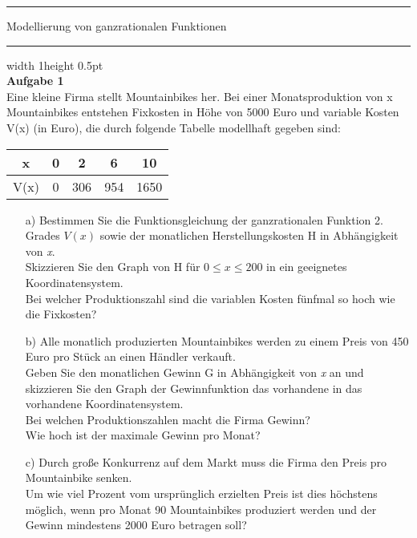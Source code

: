 \hrule \vspace{1ex}
Modellierung von ganzrationalen Funktionen %
\vspace{0,2ex}\hrule width 1\textwidth height 0.5pt
\ \\[0,5cm]
	\textbf{Aufgabe 1}\\[0,2cm]
		Eine kleine Firma stellt Mountainbikes her. Bei einer Monatsproduktion von x Mountainbikes entstehen Fixkosten in 	Höhe von 5000 Euro und variable Kosten V(x) (in Euro), die durch folgende Tabelle modellhaft gegeben sind:\\
	\begin{center}
		\begin{tabular}{|c|c|c|c|c|}\hline
			x	&	0	&	2	&	6	&	10\\	\hline		%
			V(x)&	0	&	306	&	954	&	1650\\	\hline		%
		\end{tabular}
	\end{center}
	\begin{itemize}
		\item[a)]Bestimmen Sie die Funktionsgleichung der ganzrationalen Funktion 2. Grades \(V(x)\) sowie der monatlichen Herstellungskosten H in Abhängigkeit von \textit{x}.\\
			Skizzieren Sie den Graph von H für \(0 \leqslant x \leqslant 200\) in ein geeignetes Koordinatensystem.\\
			Bei welcher Produktionszahl sind die variablen Kosten fünfmal so hoch wie die Fixkosten?\\
		\item[b)]Alle monatlich produzierten Mountainbikes werden zu einem Preis von 450 Euro pro Stück an einen Händler verkauft.\\
			Geben Sie den monatlichen Gewinn G in Abhängigkeit von \textit{x} an und skizzieren Sie den Graph der Gewinnfunktion das vorhandene in das vorhandene Koordinatensystem.\\
			Bei welchen Produktionszahlen macht die Firma Gewinn?\\
			Wie hoch ist der maximale Gewinn pro Monat?\\
		\item[c)]Durch große Konkurrenz auf dem Markt muss die Firma den Preis pro Mountainbike senken.\\
			Um wie viel Prozent vom ursprünglich erzielten Preis ist dies höchstens möglich, wenn pro Monat 90 Mountainbikes produziert werden und der Gewinn mindestens 2000 Euro betragen soll?\\[0,3cm]
	\end{itemize}
